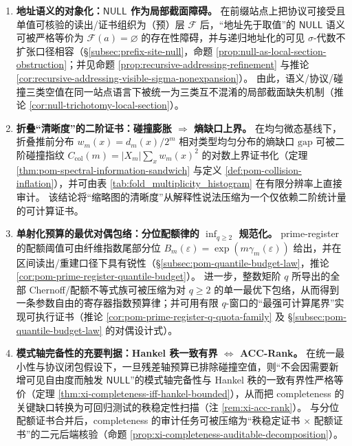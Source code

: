 \begin{enumerate}
  \item \textbf{地址语义的对象化：\(\mathsf{NULL}\) 作为局部截面障碍。}
  在前缀站点上把协议可接受且单值可核验的读出/证书组织为（预）层 \(\mathscr F\) 后，“地址先于取值”的 \(\mathsf{NULL}\) 语义可被严格等价为 \(\mathscr F(a)=\varnothing\) 的存在性障碍，并与递归地址化的可见 \(\sigma\)-代数不扩张口径相容（\S\ref{subsec:prefix-site-null}，命题 \ref{prop:null-as-local-section-obstruction}；并见命题 \ref{prop:recursive-addressing-refinement} 与推论 \ref{cor:recursive-addressing-visible-sigma-nonexpansion}）。
  由此，语义/协议/碰撞三类空值在同一站点语言下被统一为三类互不混淆的局部截面缺失机制（推论 \ref{cor:null-trichotomy-local-section}）。

  \item \textbf{折叠“清晰度”的二阶证书：碰撞膨胀 \(\Rightarrow\) 熵缺口上界。}
  在均匀微态基线下，折叠推前分布 \(w_m(x)=d_m(x)/2^m\) 相对类型均匀分布的熵缺口 \(\mathrm{gap}\) 可被二阶碰撞指纹
  \(C_{\mathrm{col}}(m)=|X_m|\sum_x w_m(x)^2\)
  的对数上界证书化（定理 \ref{thm:pom-spectral-information-sandwich} 与定义 \ref{def:pom-collision-inflation}），并可由表 \ref{tab:fold_multiplicity_histogram} 在有限分辨率上直接审计。
  该结论将“缩略图的清晰度”从解释性说法压缩为一个仅依赖二阶统计量的可计算证书。

  \item \textbf{单射化预算的最优对偶包络：分位配额律的 \(\inf_{q\ge 2}\) 规范化。}
  prime-register 的配额阈值可由纤维指数尾部分位 \(B_m(\varepsilon)=\exp(m\gamma_m(\varepsilon))\) 给出，并在区间读出/重建口径下具有锐性（\S\ref{subsec:pom-quantile-budget-law}，推论 \ref{cor:pom-prime-register-quantile-budget}）。
  进一步，整数矩阶 \(q\) 所导出的全部 Chernoff/配额不等式族可被压缩为对 \(q\ge 2\) 的单一最优下包络，从而得到一条参数自由的寄存器指数预算律；并可用有限 \(q\)-窗口的“最强可计算尾界”实现可执行证书（推论 \ref{cor:pom-prime-register-q-quota-family} 及 \S\ref{subsec:pom-quantile-budget-law} 的对偶设计式）。

  \item \textbf{模式轴完备性的充要判据：Hankel 秩一致有界 \(\Longleftrightarrow\) ACC-Rank。}
  在统一最小性与协议闭包假设下，一旦残差轴预算已排除碰撞空值，则“不会因需要新增可见自由度而触发 \(\mathsf{NULL}\)”的模式轴完备性与 Hankel 秩的一致有界性严格等价（定理 \ref{thm:xi-completeness-iff-hankel-bounded}），从而把 completeness 的关键缺口转换为可回归测试的秩稳定性扫描（注 \ref{rem:xi-acc-rank}）。
  与分位配额证书合并后，completeness 的审计任务可被压缩为“秩稳定证书 \(\times\) 配额证书”的二元后端核验（命题 \ref{prop:xi-completeness-auditable-decomposition}）。
\end{enumerate}


